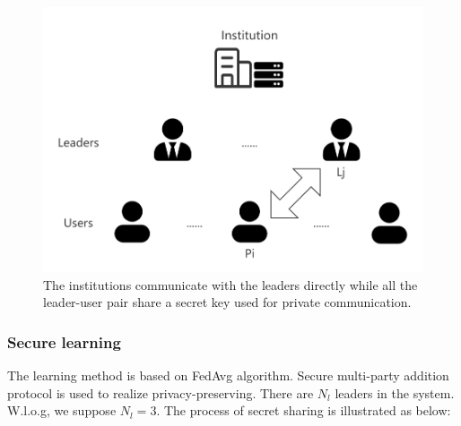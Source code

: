 \begin{figure}[!ht]
    \centering
    \includegraphics[width=\columnwidth]{img/leader-user.png}
    \caption{The institutions communicate with the leaders directly while all the leader-user pair share a secret key used for private communication.}
    \label{leader-user}
\end{figure}

\subsubsection{\textbf{Secure learning}}
The learning method is based on FedAvg algorithm\cite{mcmahan2016communicationefficient}. Secure multi-party addition protocol is used to realize privacy-preserving. There are $N_l$ leaders in the system. W.l.o.g, we suppose $N_l = 3$. The process of secret sharing is illustrated as below:

